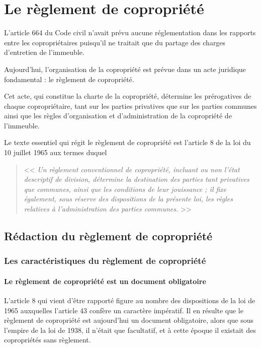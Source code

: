 \chapter{Le règlement de copropriété}

L'article 664 du Code civil n'avait prévu aucune réglementation dans les rapports entre les copropriétaires puisqu'il ne traitait que du partage des charges d'entretien de l'immeuble.

Aujourd'hui, l'organisation de la copropriété est prévue dans un acte juridique fondamental : le règlement de copropriété.

Cet acte, qui constitue la charte de la copropriété, détermine les prérogatives de chaque copropriétaire, tant sur les parties privatives que sur les parties communes ainsi que les règles d'organisation et d'administration de la copropriété de l'immeuble.

Le texte essentiel qui régit le règlement de copropriété est l'article 8 de la loi du 10 juillet 1965 aux termes duquel
\begin{quote}
	<< {\itshape Un règlement conventionnel de copropriété, incluant ou non l'état descriptif de division, détermine la destination des parties tant privatives que communes, ainsi que les conditions de leur jouissance ; il fixe également, sous réserve des dispositions de la présente loi, les règles relatives à l'administration des parties communes.} >>
\end{quote}

\section{Rédaction du règlement de copropriété}

	\subsection{Les caractéristiques du règlement de copropriété}
	
		\subsubsection{Le règlement de copropriété est un document obligatoire}
		
			L'article 8 qui vient d'être rapporté figure au nombre des dispositions de la loi de 1965 auxquelles l'article 43 confère un caractère impératif. Il en résulte que le règlement de copropriété est aujourd'hui un document obligatoire, alors que sous l'empire de la loi de 1938, il n'était que facultatif, et à cette époque il existait des copropriétés sans règlement.
			
